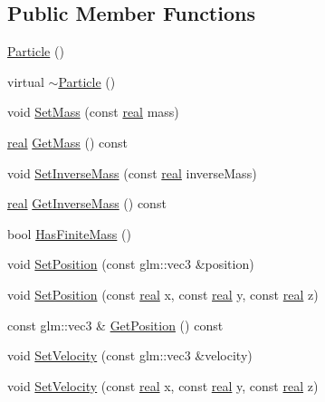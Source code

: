 \subsection*{Public Member Functions}
\begin{DoxyCompactItemize}
\item 
\hyperlink{classrum_1_1_particle_a9ae5ce0fc18a8be75950b336b92ecd75}{Particle} ()
\item 
virtual \hyperlink{classrum_1_1_particle_abc143197fe05fa60a1a3ccbf7b5f0fe8}{$\sim$\+Particle} ()
\item 
void \hyperlink{classrum_1_1_particle_a6525cbbbf7709bdacb7cb431d3622661}{Set\+Mass} (const \hyperlink{namespacerum_a7e8cca23573d5eaead0f138cbaa4862c}{real} mass)
\item 
\hyperlink{namespacerum_a7e8cca23573d5eaead0f138cbaa4862c}{real} \hyperlink{classrum_1_1_particle_a060c6f1db7424d67b4c01e6f7e538eca}{Get\+Mass} () const
\item 
void \hyperlink{classrum_1_1_particle_a2233ab971870fc1cf2337f01cdcae4fb}{Set\+Inverse\+Mass} (const \hyperlink{namespacerum_a7e8cca23573d5eaead0f138cbaa4862c}{real} inverse\+Mass)
\item 
\hyperlink{namespacerum_a7e8cca23573d5eaead0f138cbaa4862c}{real} \hyperlink{classrum_1_1_particle_a97e3662e7232daf4f2eabb79e4e06a3e}{Get\+Inverse\+Mass} () const
\item 
bool \hyperlink{classrum_1_1_particle_a0c19cd4e0c2933b4cc6357bb70c2c1a1}{Has\+Finite\+Mass} ()
\item 
void \hyperlink{classrum_1_1_particle_a2c564f2fe0122a6dd33b8113fde29e6d}{Set\+Position} (const glm\+::vec3 \&position)
\item 
void \hyperlink{classrum_1_1_particle_a1886668419cd31d6e0dacd1b62087ca0}{Set\+Position} (const \hyperlink{namespacerum_a7e8cca23573d5eaead0f138cbaa4862c}{real} x, const \hyperlink{namespacerum_a7e8cca23573d5eaead0f138cbaa4862c}{real} y, const \hyperlink{namespacerum_a7e8cca23573d5eaead0f138cbaa4862c}{real} z)
\item 
const glm\+::vec3 \& \hyperlink{classrum_1_1_particle_a78064d4405febbf7939070d1d2861594}{Get\+Position} () const
\item 
void \hyperlink{classrum_1_1_particle_a48c69c70728f76190cf698a0bb733607}{Set\+Velocity} (const glm\+::vec3 \&velocity)
\item 
void \hyperlink{classrum_1_1_particle_a481befad17e369f9ca7de3d60965a5d8}{Set\+Velocity} (const \hyperlink{namespacerum_a7e8cca23573d5eaead0f138cbaa4862c}{real} x, const \hyperlink{namespacerum_a7e8cca23573d5eaead0f138cbaa4862c}{real} y, const \hyperlink{namespacerum_a7e8cca23573d5eaead0f138cbaa4862c}{real} z)

\end{DoxyCompactItemize}
